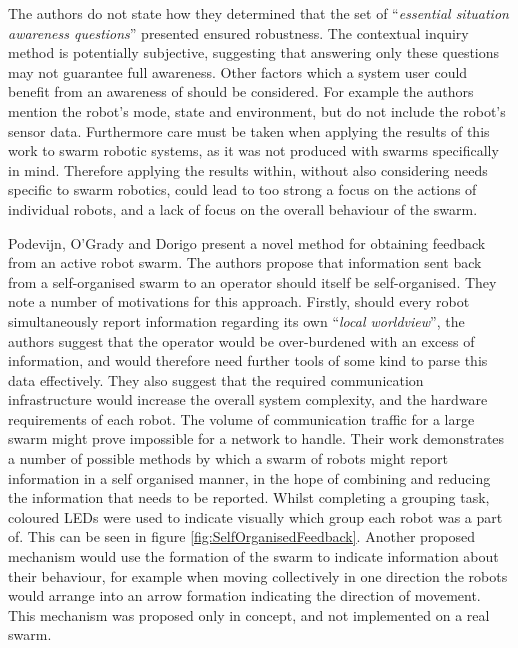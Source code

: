 The authors \cite{Rule:2012} do not state how they determined that the set of ``\textit{essential situation awareness questions}'' presented ensured robustness. The contextual inquiry method is potentially subjective, suggesting that answering only these questions may not guarantee full awareness. Other factors which a system user could benefit from an awareness of should be considered. For example the authors mention the robot's mode, state and environment, but do not include the robot's sensor data. Furthermore care must be taken when applying the results of this work to swarm robotic systems, as it was not produced with swarms specifically in mind. Therefore applying the results within, without also considering needs specific to swarm robotics, could lead to too strong a focus on the actions of individual robots, and a lack of focus on the overall behaviour of the swarm.

Podevijn, O'Grady and Dorigo \cite{Podevijn:2012} present a novel method for obtaining feedback from an active robot swarm. The authors propose that information sent back from a self-organised swarm to an operator should itself be self-organised. They note a number of motivations for this approach. Firstly, should every robot simultaneously report information regarding its own ``\textit{local worldview}'', the authors suggest \cite{Podevijn:2012} that the operator would be over-burdened with an excess of information, and would therefore need further tools of some kind to parse this data effectively. They also suggest that the required communication infrastructure would increase the overall system complexity, and the hardware requirements of each robot. The volume of communication traffic for a large swarm might prove impossible for a network to handle. Their work \cite{Podevijn:2012} demonstrates a number of possible methods by which a swarm of robots might report information in a self organised manner, in the hope of combining and reducing the information that needs to be reported. Whilst completing a grouping task, coloured LEDs were used to indicate visually which group each robot was a part of. This can be seen in figure \ref{fig:SelfOrganisedFeedback}. Another proposed mechanism \cite{Podevijn:2012} would use the formation of the swarm to indicate information about their behaviour, for example when moving collectively in one direction the robots would arrange into an arrow formation indicating the direction of movement. This mechanism was proposed only in concept, and not implemented on a real swarm.

